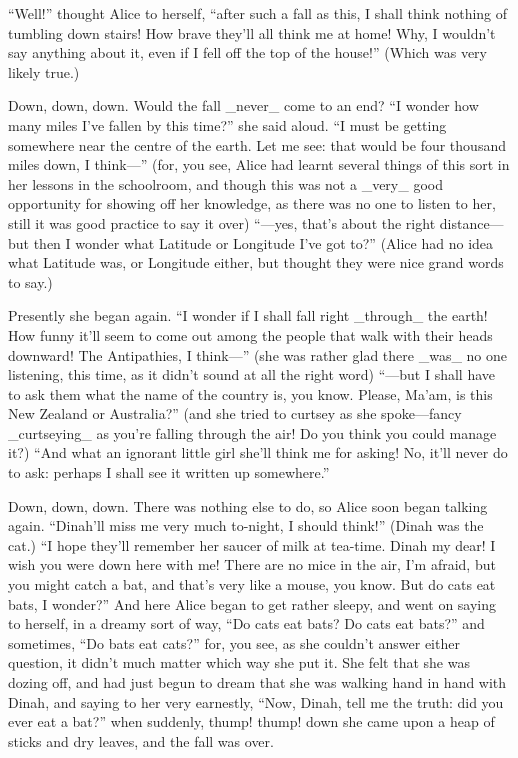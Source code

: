 \documentclass{book}
\begin{document}
``Well!'' thought Alice to herself, ``after such a fall as this, I shall think nothing of tumbling down stairs! How brave they’ll all think me at home! Why, I wouldn’t say anything about it, even if I fell off the top of the house!'' (Which was very likely true.)

Down, down, down. Would the fall \_never\_ come to an end? ``I wonder how many miles I’ve fallen by this time?'' she said aloud. ``I must be getting somewhere near the centre of the earth. Let me see: that would be four thousand miles down, I think—'' (for, you see, Alice had learnt several things of this sort in her lessons in the schoolroom, and though this was not a \_very\_ good opportunity for showing off her knowledge, as there was no one to listen to her, still it was good practice to say it over) ``—yes, that’s about the right distance—but then I wonder what Latitude or Longitude I’ve got to?'' (Alice had no idea what Latitude was, or Longitude either, but thought they were nice grand words to say.)

Presently she began again. ``I wonder if I shall fall right \_through\_ the earth! How funny it’ll seem to come out among the people that walk with their heads downward! The Antipathies, I think—'' (she was rather glad there \_was\_ no one listening, this time, as it didn’t sound at all the right word) ``—but I shall have to ask them what the name of the country is, you know. Please, Ma’am, is this New Zealand or Australia?'' (and she tried to curtsey as she spoke—fancy \_curtseying\_ as you’re falling through the air! Do you think you could manage it?) ``And what an ignorant little girl she’ll think me for asking! No, it’ll never do to ask: perhaps I shall see it written up somewhere.''

Down, down, down. There was nothing else to do, so Alice soon began talking again. ``Dinah’ll miss me very much to-night, I should think!'' (Dinah was the cat.) ``I hope they’ll remember her saucer of milk at tea-time. Dinah my dear! I wish you were down here with me! There are no mice in the air, I’m afraid, but you might catch a bat, and that’s very like a mouse, you know. But do cats eat bats, I wonder?'' And here Alice began to get rather sleepy, and went on saying to herself, in a dreamy sort of way, ``Do cats eat bats? Do cats eat bats?'' and sometimes, ``Do bats eat cats?'' for, you see, as she couldn’t answer either question, it didn’t much matter which way she put it. She felt that she was dozing off, and had just begun to dream that she was walking hand in hand with Dinah, and saying to her very earnestly, ``Now, Dinah, tell me the truth: did you ever eat a bat?'' when suddenly, thump! thump! down she came upon a heap of sticks and dry leaves, and the fall was over.
\end{document}
